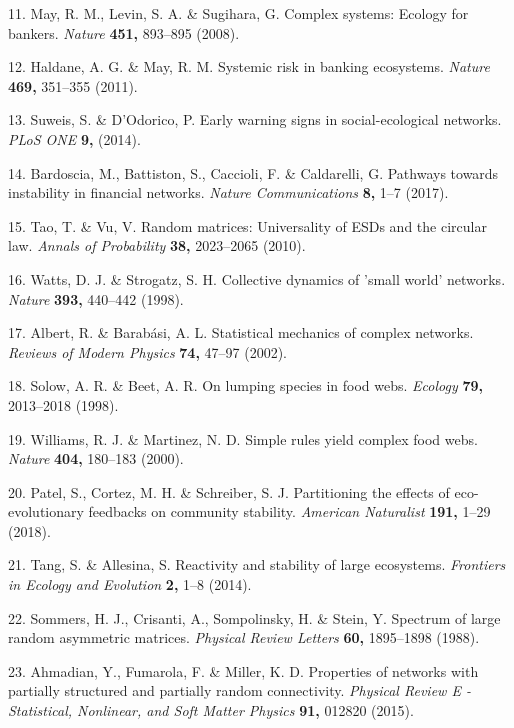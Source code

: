 \documentclass[]{article}
\begin{document}
\hypertarget{ref-May2008}{}
11. May, R. M., Levin, S. A. \& Sugihara, G. Complex systems: Ecology
for bankers. \emph{Nature} \textbf{451,} 893--895 (2008).

\hypertarget{ref-Haldane2011}{}
12. Haldane, A. G. \& May, R. M. Systemic risk in banking ecosystems.
\emph{Nature} \textbf{469,} 351--355 (2011).

\hypertarget{ref-Suweis2014}{}
13. Suweis, S. \& D'Odorico, P. Early warning signs in social-ecological
networks. \emph{PLoS ONE} \textbf{9,} (2014).

\hypertarget{ref-Bardoscia2017}{}
14. Bardoscia, M., Battiston, S., Caccioli, F. \& Caldarelli, G.
Pathways towards instability in financial networks. \emph{Nature
Communications} \textbf{8,} 1--7 (2017).

\hypertarget{ref-Tao2010}{}
15. Tao, T. \& Vu, V. Random matrices: Universality of ESDs and the
circular law. \emph{Annals of Probability} \textbf{38,} 2023--2065
(2010).

\hypertarget{ref-Watts1998}{}
16. Watts, D. J. \& Strogatz, S. H. Collective dynamics of 'small world'
networks. \emph{Nature} \textbf{393,} 440--442 (1998).

\hypertarget{ref-Albert2002}{}
17. Albert, R. \& Barabási, A. L. Statistical mechanics of complex
networks. \emph{Reviews of Modern Physics} \textbf{74,} 47--97 (2002).

\hypertarget{ref-Solow1998}{}
18. Solow, A. R. \& Beet, A. R. On lumping species in food webs.
\emph{Ecology} \textbf{79,} 2013--2018 (1998).

\hypertarget{ref-Williams2000}{}
19. Williams, R. J. \& Martinez, N. D. Simple rules yield complex food
webs. \emph{Nature} \textbf{404,} 180--183 (2000).

\hypertarget{ref-Patel2018}{}
20. Patel, S., Cortez, M. H. \& Schreiber, S. J. Partitioning the
effects of eco-evolutionary feedbacks on community stability.
\emph{American Naturalist} \textbf{191,} 1--29 (2018).

\hypertarget{ref-Tang2014b}{}
21. Tang, S. \& Allesina, S. Reactivity and stability of large
ecosystems. \emph{Frontiers in Ecology and Evolution} \textbf{2,} 1--8
(2014).

\hypertarget{ref-Sommers1988}{}
22. Sommers, H. J., Crisanti, A., Sompolinsky, H. \& Stein, Y. Spectrum
of large random asymmetric matrices. \emph{Physical Review Letters}
\textbf{60,} 1895--1898 (1988).

\hypertarget{ref-Ahmadian2015}{}
23. Ahmadian, Y., Fumarola, F. \& Miller, K. D. Properties of networks
with partially structured and partially random connectivity.
\emph{Physical Review E - Statistical, Nonlinear, and Soft Matter
Physics} \textbf{91,} 012820 (2015).
\end{document}
